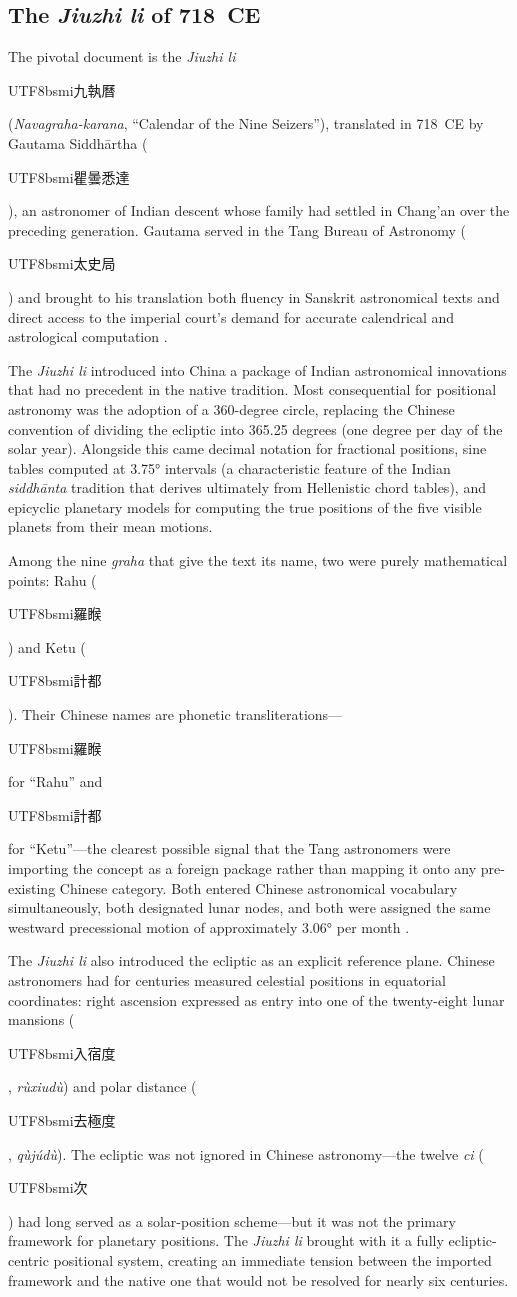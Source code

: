 \documentclass[10pt,a4paper]{article}
\newcommand{\zh}[1]{\begin{CJK}{UTF8}{bsmi}#1\end{CJK}}
\begin{document}
\subsection*{The \textit{Jiuzhi li} of 718~CE}

The pivotal document is the \textit{Jiuzhi li} \zh{九執曆}
(\textit{Navagraha-karana}, ``Calendar of the Nine Seizers''), translated
in 718~CE by Gautama Siddh\=artha (\zh{瞿曇悉達}), an astronomer of
Indian descent whose family had settled in Chang'an over the preceding
generation.  Gautama served in the Tang Bureau of Astronomy
(\zh{太史局}) and brought to his translation both fluency in Sanskrit
astronomical texts and direct access to the imperial court's demand for
accurate calendrical and astrological computation
\cite{yabuuchi1989sui,kotyk2018sinicization}.

The \textit{Jiuzhi li} introduced into China a package of Indian
astronomical innovations that had no precedent in the native tradition.
Most consequential for positional astronomy was the adoption of a
360-degree circle, replacing the Chinese convention of dividing the
ecliptic into 365.25 degrees (one degree per day of the solar year).
Alongside this came decimal notation for fractional positions, sine
tables computed at 3.75° intervals (a characteristic feature of the
Indian \textit{siddh\=anta} tradition that derives ultimately from
Hellenistic chord tables), and epicyclic planetary models for computing
the true positions of the five visible planets from their mean motions.

Among the nine \textit{graha} that give the text its name, two were
purely mathematical points: Rahu (\zh{羅睺}) and Ketu (\zh{計都}).
Their Chinese names are phonetic transliterations---\zh{羅睺} for
``Rahu'' and \zh{計都} for ``Ketu''---the clearest possible signal that
the Tang astronomers were importing the concept as a foreign package
rather than mapping it onto any pre-existing Chinese category.  Both
entered Chinese astronomical vocabulary simultaneously, both designated
lunar nodes, and both were assigned the same westward precessional
motion of approximately 3.06° per month
\cite{yabuuchi1989sui,kotyk2018sinicization}.

The \textit{Jiuzhi li} also introduced the ecliptic as an explicit
reference plane.  Chinese astronomers had for centuries measured
celestial positions in equatorial coordinates: right ascension expressed
as entry into one of the twenty-eight lunar mansions (\zh{入宿度},
\textit{r\`uxiud\`u}) and polar distance (\zh{去極度}, \textit{q\`uj\'ud\`u}).
The ecliptic was not ignored in Chinese astronomy---the twelve
\textit{ci} (\zh{次}) had long served as a solar-position scheme---but
it was not the primary framework for planetary positions.  The
\textit{Jiuzhi li} brought with it a fully ecliptic-centric positional
system, creating an immediate tension between the imported framework and
the native one that would not be resolved for nearly six centuries.
\end{document}
